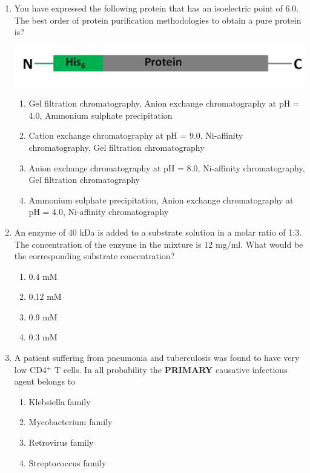 \documentclass[journal]{IEEEtran}
\begin{document}
\begin{enumerate}
\item You have expressed the following protein that has an isoelectric point of 6.0. The best order of protein purification methodologies to obtain a pure protein is?\hfill  \textit{}
\begin{center}
    \includegraphics[width=0.5\columnwidth]{figs/Screenshot 2025-08-05 123543.png}
\end{center}
\begin{enumerate}
    \item Gel filtration chromatography, Anion exchange chromatography at pH = 4.0, Ammonium sulphate precipitation
    \item Cation exchange chromatography at pH = 9.0, Ni-affinity chromatography, Gel filtration chromatography
    \item Anion exchange chromatography at pH = 8.0, Ni-affinity chromatography, Gel filtration chromatography
    \item Ammonium sulphate precipitation, Anion exchange chromatography at pH = 4.0, Ni-affinity chromatography
\end{enumerate}

\item An enzyme of 40 kDa is added to a substrate solution in a molar ratio of 1:3. The concentration of the enzyme in the mixture is 12 mg/ml. What would be the corresponding substrate concentration?\hfill  \textit{}
\begin{enumerate}
    \item 0.4 mM
    \item 0.12 mM
    \item 0.9 mM
    \item 0.3 mM
\end{enumerate}

\item A patient suffering from pneumonia and tuberculosis was found to have very low CD4$^+$ T cells. In all probability the \textbf{PRIMARY} causative infectious agent belongs to\hfill  \textit{}
\begin{enumerate}
    \item Klebsiella family
    \item Mycobacterium family
    \item Retrovirus family
    \item Streptococcus family
\end{enumerate}


\end{enumerate}
\end{document}
